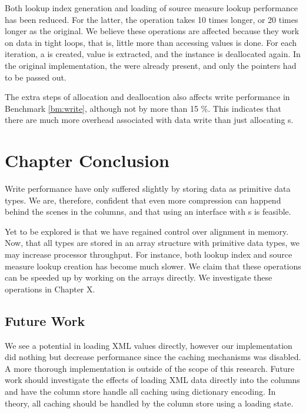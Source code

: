 Both lookup index generation and loading of source measure lookup performance has been reduced. For the latter, the operation takes 10 times longer, or 20 times longer as the original. We believe these operations are affected because they work on data in tight loops, that is, little more than accessing values is done. For each iteration, a  is created, value is extracted, and the instance is deallocated again. In the original implementation, the  were already present, and only the pointers had to be passed out.

The extra steps of  allocation and deallocation also affects write performance in Benchmark \ref{bm:write}, although not by more than 15 \%. This indicates that there are much more overhead associated with data write than just allocating s.

\section{Chapter Conclusion}
\label{sec:Chapter Conclusion}
Write performance have only suffered slightly by storing data as primitive data types. We are, therefore, confident that even more compression can happend behind the scenes in the columns, and that using an interface with s is feasible. 

Yet to be explored is that we have regained control over alignment in memory. Now, that all types are stored in an array structure with primitive data types, we may increase processor throughput. For instance, both lookup index and source measure lookup creation has become much slower. We claim that these operations can be speeded up by working on the arrays directly. We investigate these operations in Chapter X.

\subsection{Future Work}
\label{sub:Future Work}
We see a potential in loading XML values directly, however our implementation did nothing but decrease performance since the caching mechanisms was disabled. A more thorough implementation is outside of the scope of this research. Future work should investigate the effects of loading XML data directly into the columns and have the column store handle all caching using dictionary encoding. In theory, all caching should be handled by the column store using a loading state.
